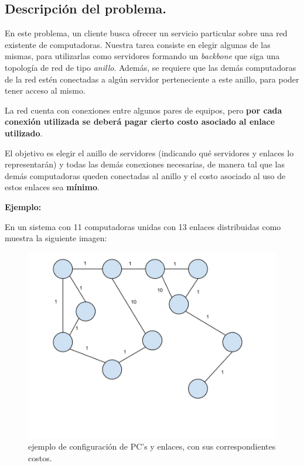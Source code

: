 \subsection{Descripción del problema.}

\vspace*{0.3cm}

En este problema, un cliente busca ofrecer un servicio particular sobre una
red existente de computadoras. Nuestra tarea consiste en elegir algunas de las
mismas, para utilizarlas como servidores formando un \textit{backbone} que
siga una topología de red de tipo \textit{anillo}. Además, se requiere que
las demás computadoras de la red estén conectadas a algún servidor
perteneciente a este anillo, para poder tener acceso al mismo.

La red cuenta con conexiones entre algunos pares de equipos, pero
\textbf{por cada conexión utilizada se deberá pagar cierto costo
asociado al enlace utilizado}.

\medskip

El objetivo es elegir el anillo de servidores (indicando qué servidores y
enlaces lo representarán) y todas las demás conexiones necesarias, de
manera tal que las demás computadoras queden conectadas al anillo y el costo
asociado al uso de estos enlaces sea \textbf{mínimo}.

\vspace*{0.5cm}

\textbf{Ejemplo:}

En un sistema con 11 computadoras unidas con 13 enlaces distribuidas como
muestra la siguiente imagen:

\begin{figure}[htb]
  \begin{center}
      \includegraphics[scale=0.25]{imagenes/anillo-sin-hacer.jpg}
  \end{center}
  \caption{ejemplo de configuración de PC's y enlaces, con sus correspondientes costos.}
\end{figure}

